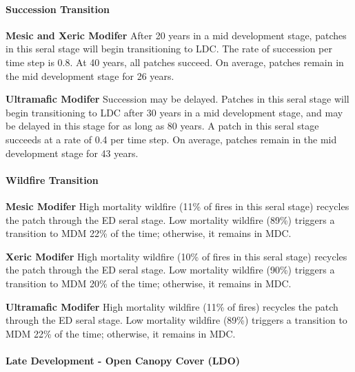 \paragraph{Succession Transition}
\begin{adjustwidth}{2cm}{}
\textbf{Mesic and Xeric Modifer } After 20 years in a mid development stage, patches in this seral stage will begin transitioning to LDC. The rate of succession per time step is 0.8. At 40 years, all patches succeed. On average, patches remain in the mid development stage for 26 years.

\medskip
\noindent \textbf{Ultramafic Modifer} Succession may be delayed. Patches in this seral stage will begin transitioning to LDC after 30 years in a mid development stage, and may be delayed in this stage for as long as 80 years. A patch in this seral stage succeeds at a rate of 0.4 per time step. On average, patches remain in the mid development stage for 43 years.

\end{adjustwidth}
\paragraph{Wildfire Transition}
\begin{adjustwidth}{2cm}{}
\textbf{Mesic Modifer } High mortality wildfire (11\% of fires in this seral stage) recycles the patch through the ED seral stage. Low mortality wildfire (89\%) triggers a transition to MDM 22\% of the time; otherwise, it remains in MDC.

\medskip
\noindent \textbf{Xeric Modifer} High mortality wildfire (10\% of fires in this seral stage) recycles the patch through the ED seral stage. Low mortality wildfire (90\%) triggers a transition to MDM 20\% of the time; otherwise, it remains in MDC.

\medskip
\noindent \textbf{Ultramafic Modifer} High mortality wildfire (11\% of fires) recycles the patch through the ED seral stage. Low mortality wildfire (89\%) triggers a transition to MDM 22\% of the time; otherwise, it remains in MDC.

\end{adjustwidth}
\noindent\hrulefill


\paragraph{Late Development - Open Canopy Cover (LDO)}

